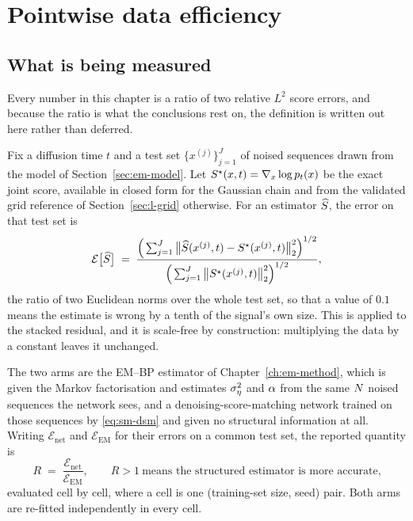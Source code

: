 \section{Pointwise data efficiency}\label{sec:em-pointwise}

\subsection{What is being measured}\label{sec:em-estimand}

Every number in this chapter is a ratio of two relative $L^2$ score errors, and
because the ratio is what the conclusions rest on, the definition is written
out here rather than deferred.

Fix a diffusion time $t$ and a test set $\{x^{(j)}\}_{j=1}^{J}$ of noised
sequences drawn from the model of Section~\ref{sec:em-model}. Let
$S^{\star}(x,t) = \nabla_x \log p_t(x)$ be the exact joint score, available
in closed form for the Gaussian chain and from the validated grid reference of
Section~\ref{sec:l-grid} otherwise. For an estimator $\widehat{S}$, the
error on that test set is
\begin{equation}
  \mathcal{E}\big[\widehat{S}\big]
  \;=\;
  \frac{\Big(\sum_{j=1}^{J}\big\lVert \widehat{S}(x^{(j)},t) - S^{\star}(x^{(j)},t)\big\rVert_2^2\Big)^{1/2}}
       {\Big(\sum_{j=1}^{J}\big\lVert S^{\star}(x^{(j)},t)\big\rVert_2^2\Big)^{1/2}},
  \label{eq:em-relerr}
\end{equation}
the ratio of two Euclidean norms over the whole test set, so that a value of
$0.1$ means the estimate is wrong by a tenth of the signal's own size. This is
 applied to the stacked residual, and it is scale-free
by construction: multiplying the data by a constant leaves it unchanged.

The two arms are the EM--BP estimator of Chapter~\ref{ch:em-method}, which is
given the Markov factorisation and estimates $\sigma_\eta^2$ and $\alpha$ from the same
$N$ noised sequences the network sees, and a denoising-score-matching
network trained on those sequences by \eqref{eq:sm-dsm} and given no structural
information at all. Writing $\mathcal{E}_{\mathrm{net}}$ and
$\mathcal{E}_{\mathrm{EM}}$ for their errors on a common test set, the reported
quantity is
\begin{equation}
  R \;=\; \frac{\mathcal{E}_{\mathrm{net}}}{\mathcal{E}_{\mathrm{EM}}},
  \qquad R > 1 \ \text{means the structured estimator is more accurate,}
  \label{eq:em-ratio}
\end{equation}
evaluated cell by cell, where a cell is one (training-set size, seed) pair.
Both arms are re-fitted independently in every cell.

